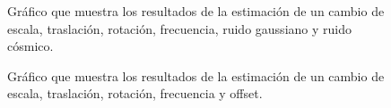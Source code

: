 \begin{figure}[H]
\begin{center}
\hspace{0.5cm}

\end{center}

\caption{Gráfico que muestra los resultados de la estimación de un cambio de escala, traslación, rotación, frecuencia, ruido gaussiano y ruido cósmico.}
\end{figure}



\begin{figure}[H]
\begin{center}
\hspace{0.5cm}

\end{center}

\caption{Gráfico que muestra los resultados de la estimación de un cambio de escala, traslación, rotación, frecuencia y offset.}
\end{figure}


